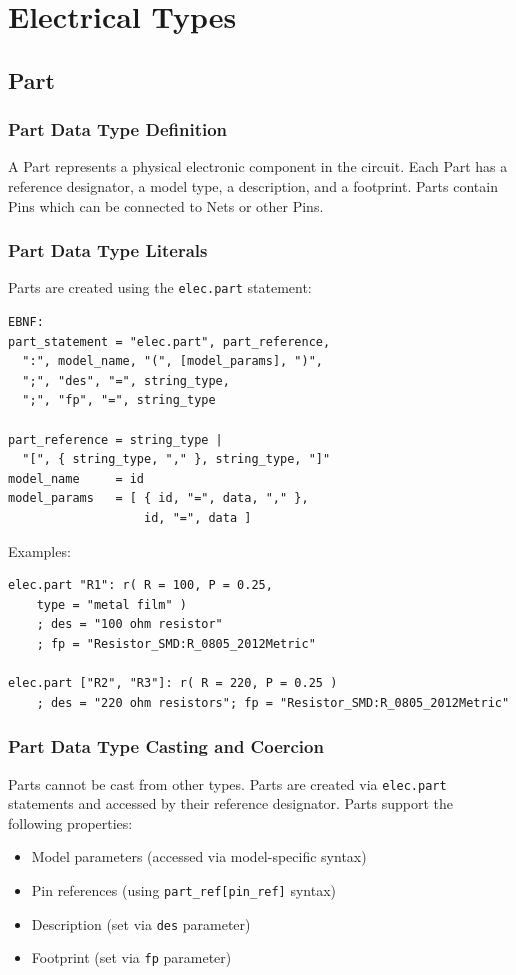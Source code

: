 \documentclass{report}
\begin{document}
\section{Electrical Types}
\subsection{Part}
\subsubsection{Part Data Type Definition}
A Part represents a physical electronic component in the circuit. Each Part has a reference designator, a model type, a description, and a footprint. Parts contain Pins which can be connected to Nets or other Pins.
\subsubsection{Part Data Type Literals}
Parts are created using the \texttt{elec.part} statement:
\begin{verbatim}
EBNF:
part_statement = "elec.part", part_reference, 
  ":", model_name, "(", [model_params], ")", 
  ";", "des", "=", string_type, 
  ";", "fp", "=", string_type

part_reference = string_type | 
  "[", { string_type, "," }, string_type, "]"
model_name     = id
model_params   = [ { id, "=", data, "," }, 
                   id, "=", data ]
\end{verbatim}
Examples:
\begin{verbatim}
elec.part "R1": r( R = 100, P = 0.25, 
    type = "metal film" )
    ; des = "100 ohm resistor"
    ; fp = "Resistor_SMD:R_0805_2012Metric"

elec.part ["R2", "R3"]: r( R = 220, P = 0.25 )
    ; des = "220 ohm resistors"; fp = "Resistor_SMD:R_0805_2012Metric"
\end{verbatim}
\subsubsection{Part Data Type Casting and Coercion}
Parts cannot be cast from other types. Parts are created via \texttt{elec.part} statements and accessed by their reference designator. Parts support the following properties:
\begin{itemize}
\item Model parameters (accessed via model-specific syntax)
\item Pin references (using \texttt{part\_ref[pin\_ref]} syntax)
\item Description (set via \texttt{des} parameter)
\item Footprint (set via \texttt{fp} parameter)
\end{itemize}
\end{document}
